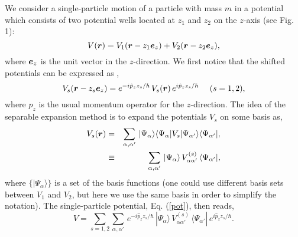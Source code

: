 \documentclass[superscriptaddress,twocolumn,amsmath,amssymb]{revtex4}
\renewcommand{\vec}[1]{\mbox{\boldmath $#1$}}
\begin{document}
We consider a single-particle motion of a particle with mass $m$ in a 
potential which consists of two 
potential wells located at $z_1$ and $z_2$ on the $z$-axis (see Fig. 1): 
%
\begin{equation}
V(\vec{r})=V_1(\vec{r}-z_1\vec{e}_z)+V_2(\vec{r}-z_2\vec{e}_z),
\label{pot}
\end{equation}
%
where $\vec{e}_z$ is the unit vector in the $z$-direction. 
We first notice that the shifted potentials can be expressed as 
\cite{GGR77,MR86}, 
%
\begin{equation}
V_s(\vec{r}-z_s\vec{e}_z)=e^{-i\hat{p}_zz_s/\hbar}\,V_s(\vec{r})\,
e^{i\hat{p}_zz_s/\hbar}~~~~(s=1,2),
\label{pot2}
\end{equation}
%
where $\hat{p}_z$
is the usual momentum operator for the $z$-direction. 
The idea of the separable expansion method \cite{GKR79,MR86,GGR77} 
is to expand the potentials 
$V_s$ on some basis as, 
%
\begin{eqnarray}
V_s(\vec{r})&=&\sum_{\alpha,\alpha'}\,|\Psi_\alpha\rangle
\langle \Psi_\alpha|V_s|\Psi_{\alpha'}\rangle
\langle \Psi_{\alpha'}|, \\
&\equiv& 
\sum_{\alpha,\alpha'}\,|\Psi_\alpha\rangle \,V_{\alpha\alpha'}^{(s)}\,
\langle \Psi_{\alpha'}|, 
\end{eqnarray}
%
where $\{|\Psi_\alpha\rangle\}$ is a set of the basis functions 
(one could use different basis sets between $V_1$ and $V_2$, but here 
we use the same basis in order to simplify the notation). 
The single-particle potential, Eq. (\ref{pot}), then reads,
%
\begin{equation}
V=\sum_{s=1,2}
\sum_{\alpha,\alpha'}\,e^{-i\hat{p}_zz_s/\hbar}\,|\Psi_\alpha\rangle \,V_{\alpha\alpha'}^{(s)}
\,\langle \Psi_{\alpha'}|\,e^{i\hat{p}_zz_s/\hbar}.
\label{pot3}
\end{equation}
\end{document}
